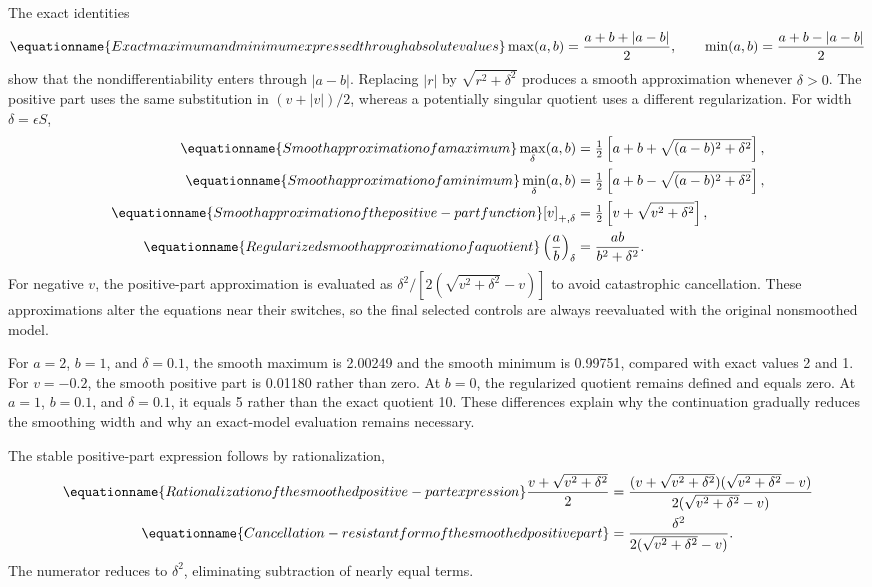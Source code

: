 The exact identities
\begin{equation}
\equationname{Exact maximum and minimum expressed through absolute values}
\max(a,b)=\frac{a+b+|a-b|}{2},\qquad
\min(a,b)=\frac{a+b-|a-b|}{2}
\end{equation}
show that the nondifferentiability enters through $|a-b|$. Replacing $|r|$ by $\sqrt{r^2+\delta^2}$ produces a smooth approximation whenever $\delta>0$. The positive part uses the same substitution in $(v+|v|)/2$, whereas a potentially singular quotient uses a different regularization. For width $\delta=\epsilon S$,
\begin{align}
\equationname{Smooth approximation of a maximum}
\max_\delta(a,b)&=\tfrac12\left[a+b+\sqrt{(a-b)^2+\delta^2}\right],\\
\equationname{Smooth approximation of a minimum}
\min_\delta(a,b)&=\tfrac12\left[a+b-\sqrt{(a-b)^2+\delta^2}\right],\\
\equationname{Smooth approximation of the positive-part function}
[v]_{+,\delta}&=\tfrac12\left[v+\sqrt{v^2+\delta^2}\right],\\
\equationname{Regularized smooth approximation of a quotient}
\left(\frac ab\right)_\delta&=\frac{ab}{b^2+\delta^2}.
\label{eq:plant_smooth_operations}
\end{align}
For negative $v$, the positive-part approximation is evaluated as $\delta^2/[2(\sqrt{v^2+\delta^2}-v)]$ to avoid catastrophic cancellation. These approximations alter the equations near their switches, so the final selected controls are always reevaluated with the original nonsmoothed model.

For $a=2$, $b=1$, and $\delta=0.1$, the smooth maximum is 2.00249 and the smooth minimum is 0.99751, compared with exact values 2 and 1. For $v=-0.2$, the smooth positive part is 0.01180 rather than zero. At $b=0$, the regularized quotient remains defined and equals zero. At $a=1$, $b=0.1$, and $\delta=0.1$, it equals 5 rather than the exact quotient 10. These differences explain why the continuation gradually reduces the smoothing width and why an exact-model evaluation remains necessary.

The stable positive-part expression follows by rationalization,
\begin{align}
\equationname{Rationalization of the smoothed positive-part expression}
\frac{v+\sqrt{v^2+\delta^2}}2
&=\frac{(v+\sqrt{v^2+\delta^2})(\sqrt{v^2+\delta^2}-v)}
{2(\sqrt{v^2+\delta^2}-v)}\\
\equationname{Cancellation-resistant form of the smoothed positive part}
&=\frac{\delta^2}{2(\sqrt{v^2+\delta^2}-v)}.
\end{align}
The numerator reduces to $\delta^2$, eliminating subtraction of nearly equal terms.

